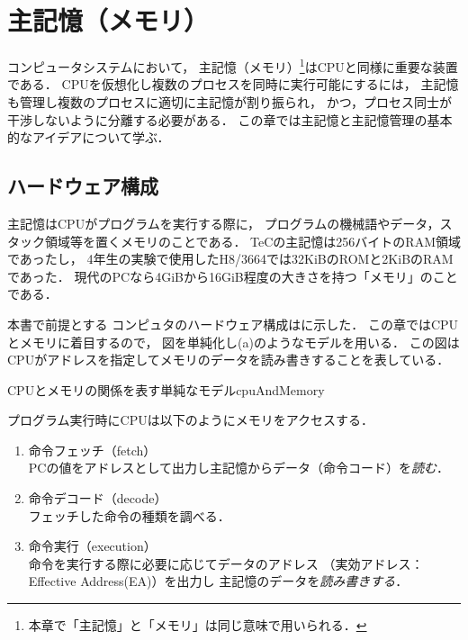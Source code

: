 \chapter{主記憶（メモリ）}
コンピュータシステムにおいて，
主記憶（メモリ）\footnote{
本章で「主記憶」と「メモリ」は同じ意味で用いられる．
}はCPUと同様に重要な装置である．
CPUを仮想化し複数のプロセスを同時に実行可能にするには，
主記憶も管理し複数のプロセスに適切に主記憶が割り振られ，
かつ，プロセス同士が干渉しないように分離する必要がある．
この章では主記憶と主記憶管理の基本的なアイデアについて学ぶ．

\section{ハードウェア構成}
主記憶はCPUがプログラムを実行する際に，
プログラムの機械語やデータ，スタック領域等を置くメモリのことである．
TeCの主記憶は256バイトのRAM領域であったし，
4年生の実験で使用したH8/3664では32KiBのROMと2KiBのRAMであった．
現代のPCなら4GiBから16GiB程度の大きさを持つ「メモリ」のことである．

本書で前提とする
コンピュタのハードウェア構成はに示した．
この章ではCPUとメモリに着目するので，
図を単純化し(a)のようなモデルを用いる．
この図はCPUがアドレスを指定してメモリのデータを読み書きすることを表している．

{CPUとメモリの関係を表す単純なモデル}{cpuAndMemory}

プログラム実行時にCPUは以下のようにメモリをアクセスする．
\begin{enumerate}
\item 命令フェッチ（fetch）\\
PCの値をアドレスとして出力し主記憶からデータ（命令コード）を\emph{読む}．
\item 命令デコード（decode） \\
フェッチした命令の種類を調べる．
\item 命令実行（execution）\\
命令を実行する際に必要に応じてデータのアドレス
（実効アドレス：Effective Address(EA)）を出力し
主記憶のデータを\emph{読み書きする}．
\end{enumerate}


